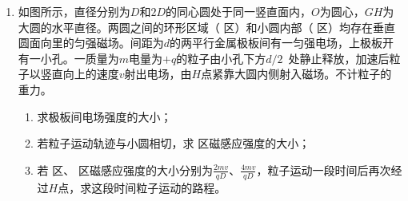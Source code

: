 \begin{enumerate}[leftmargin=0em]
\newpage
\item
{}
如图所示，直径分别为$ D $和$ 2D $的同心圆处于同一竖直面内，$ O $为圆心，$ GH $为大圆的水平直径。两圆之间的环形区域（  区）和小圆内部（  区）均存在垂直圆面向里的匀强磁场。间距为$ d $的两平行金属极板间有一匀强电场，上极板开有一小孔。一质量为$ m $电量为$ +q $的粒子由小孔下方$ d/2 $ 处静止释放，加速后粒子以竖直向上的速度$ v $射出电场，由$ H $点紧靠大圆内侧射入磁场。不计粒子的重力。
\begin{enumerate}
\renewcommand{\labelenumi}{\arabic{enumi}.}
\item
求极板间电场强度的大小；
\item 
若粒子运动轨迹与小圆相切，求  区磁感应强度的大小；
\item 
若  区、  区磁感应强度的大小分别为$\frac { 2 m v } { q D }$、$\frac { 4 m v } { q D }$，粒子运动一段时间后再次经过$ H $点，求这段时间粒子运动的路程。



\end{enumerate}
\begin{figure}[h!]
\flushright

\end{figure}







\end{enumerate}



